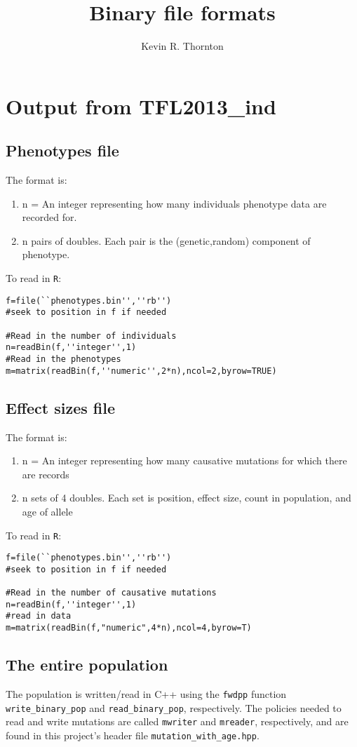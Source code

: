 \documentclass{article}
\author{Kevin R. Thornton}
\title{Binary file formats}
\begin{document}
\maketitle

\section*{Output from TFL2013\_ind}
\subsection*{Phenotypes file}
The format is:
\begin{enumerate}
\item n = An integer representing how many individuals phenotype data are recorded for.
\item n pairs of doubles.  Each pair is the (genetic,random) component of phenotype.
\end{enumerate}

To read in \texttt{R}:

\begin{lstlisting}
f=file(``phenotypes.bin'',''rb'')
#seek to position in f if needed

#Read in the number of individuals
n=readBin(f,''integer'',1)
#Read in the phenotypes
m=matrix(readBin(f,''numeric'',2*n),ncol=2,byrow=TRUE)
\end{lstlisting}

\subsection*{Effect sizes file}

The format is:
\begin{enumerate}
\item n = An integer representing how many causative mutations for which there are records
\item n sets of 4 doubles.  Each set is position, effect size, count in population, and age of allele
\end{enumerate}

To read in \texttt{R}:
\begin{lstlisting}
f=file(``phenotypes.bin'',''rb'')
#seek to position in f if needed

#Read in the number of causative mutations
n=readBin(f,''integer'',1)
#read in data
m=matrix(readBin(f,"numeric",4*n),ncol=4,byrow=T)
\end{lstlisting}

\subsection*{The entire population}
The population is written/read in C++ using the \texttt{fwdpp} function \texttt{write\_binary\_pop} and \texttt{read\_binary\_pop}, respectively.  The policies needed to read and write mutations are called \texttt{mwriter} and \texttt{mreader}, respectively, and are found in this project's header file \texttt{mutation\_with\_age.hpp}.
\end{document}
